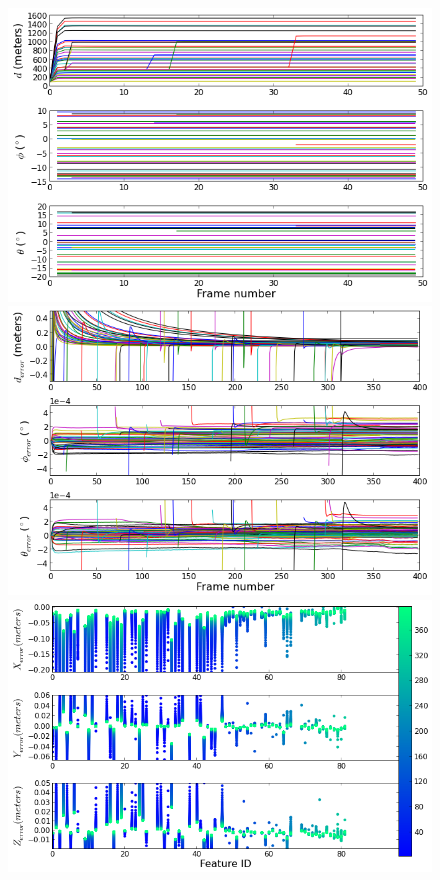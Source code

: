 \begin{figure}[h]
\centering
\includegraphics[scale=0.3]{./Figures/SimulationFigures/Figure6.png}
\includegraphics[scale=0.3]{./Figures/SimulationFigures/Figure7.png}
\includegraphics[scale=0.3]{./Figures/SimulationFigures/Figure5.png}

\end{figure}
